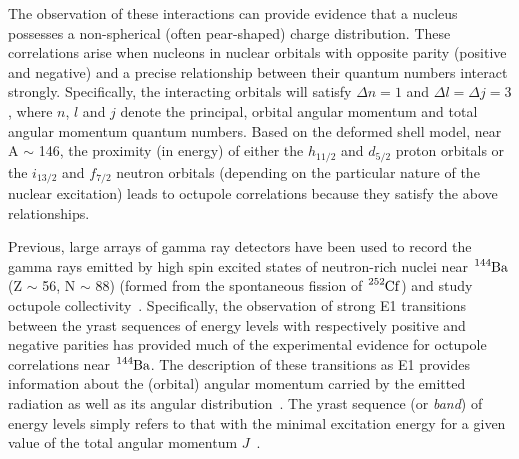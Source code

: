 \documentclass[12pt,a4paper]{article}
\begin{document}
\medskip
\noindent
The observation of these interactions can provide evidence that a nucleus possesses a non-spherical (often pear-shaped) charge distribution.
These correlations arise when nucleons in nuclear orbitals with opposite parity (positive and negative) and a precise relationship between their quantum numbers interact strongly.
Specifically, the interacting orbitals will satisfy $\Delta n = 1$ and $\Delta l = \Delta j = 3$, where $n$, $l$ and $j$ denote the principal, orbital angular momentum and total angular momentum quantum numbers.
Based on the deformed shell model, near A $\sim$ 146, the proximity (in energy) of either the $h_{11/2}$ and $d_{5/2}$ proton orbitals or the $i_{13/2}$ and $f_{7/2}$ neutron orbitals (depending on the particular nature of the nuclear excitation) leads to octupole correlations because they satisfy the above relationships.

\medskip
\noindent
Previous, large arrays of gamma ray detectors have been used to record the gamma rays emitted by high spin excited states of neutron-rich nuclei  near $\ce{^{144}Ba}$ (Z $\sim$ 56, N $\sim$ 88) (formed from the spontaneous fission of $\ce{^{252}Cf}$) and study octupole collectivity~\cite{phillips_octupole_1988,chen_search_2006}.
Specifically, the observation of strong E1 transitions between the yrast sequences of energy levels with respectively positive and negative parities has provided much of the experimental evidence for octupole correlations near $\ce{^{144}Ba}$.
The description of these transitions as E1 provides information about the (orbital) angular momentum carried by the emitted radiation as well as its angular distribution~\cite{casten_nuclear_1990}.
The yrast sequence (or \textit{band}) of energy levels simply refers to that with the minimal excitation energy for a given value of the total angular momentum $J$~\cite{casten_nuclear_1990}.
\end{document}
